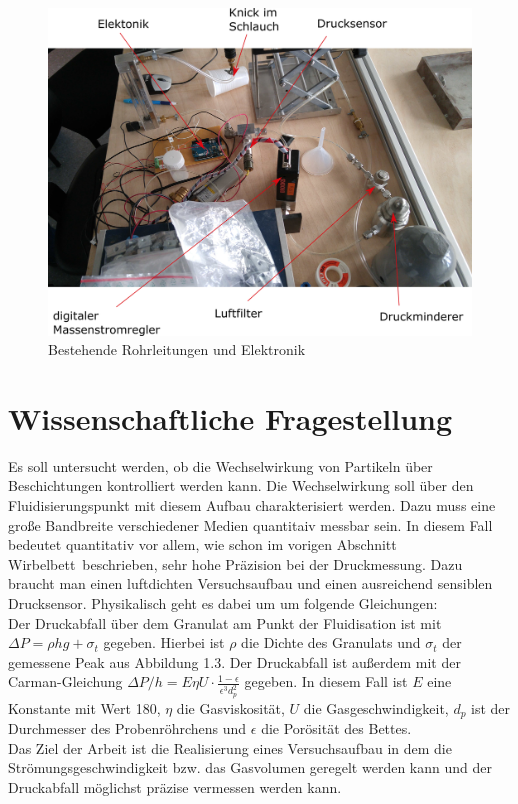 \begin{figure}[h!]
	\begin{center}
		\includegraphics[scale=0.6]{Kabel_Rohrleitungen_alt.png}
		\caption[Alter Aufbau 2]{Bestehende Rohrleitungen und Elektronik}
	\end{center}
\end{figure}


\section{Wissenschaftliche Fragestellung}

Es soll untersucht werden, ob die Wechselwirkung von Partikeln über Beschichtungen kontrolliert werden kann. Die Wechselwirkung soll über den Fluidisierungspunkt mit diesem Aufbau charakterisiert werden. Dazu muss eine große Bandbreite verschiedener Medien quantitaiv messbar sein. In diesem Fall bedeutet quantitativ vor allem, wie schon im vorigen Abschnitt \glqq Wirbelbett\grqq \ beschrieben, sehr hohe Präzision bei der Druckmessung. Dazu braucht man einen luftdichten Versuchsaufbau und einen ausreichend sensiblen Drucksensor. Physikalisch geht es dabei um um folgende Gleichungen: \\
Der Druckabfall über dem Granulat am Punkt der Fluidisation ist mit $\Delta P = \rho h g + \sigma_t$ gegeben. Hierbei ist $\rho$ die Dichte des Granulats und $\sigma_t$ der gemessene Peak aus Abbildung 1.3. Der Druckabfall ist außerdem mit der Carman-Gleichung $\Delta P / h = E \eta U \cdot \frac{1 - \epsilon}{\epsilon^3 d_p^2}$ gegeben. In diesem Fall ist $E$ eine Konstante mit Wert 180, $\eta$ die Gasviskosität, $U$ die Gasgeschwindigkeit, $d_p$ ist der Durchmesser des Probenröhrchens und $\epsilon$ die Porösität des Bettes. \\
Das Ziel der Arbeit ist die Realisierung eines Versuchsaufbau in dem die Strömungsgeschwindigkeit bzw. das Gasvolumen geregelt werden kann und der Druckabfall möglichst präzise vermessen werden kann.


